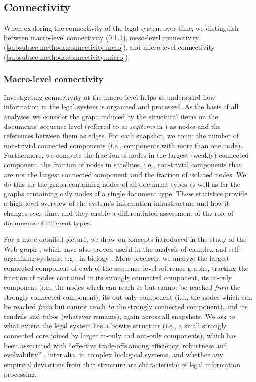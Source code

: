 \documentclass[utf8,sort&compress,table,hidelinks]{frontiersFPHY} %
\begin{document}
\vspace*{6pt}
\subsection{Connectivity}
\label{subsec:methods:connectivity}

When exploring the connectivity of the legal system over time, we distinguish between macro-level connectivity (\ref{subsubsec:methods:connectivity:macro}), meso-level connectivity (\ref{subsubsec:methods:connectivity:meso}), and micro-level connectivity (\ref{subsubsec:methods:connectivity:micro}). 

\vspace*{6pt}
\subsubsection{Macro-level connectivity}
\label{subsubsec:methods:connectivity:macro}

Investigating connectivity at the macro level helps us understand how information in the legal system is organized and processed. 
As the basis of all analyses, we consider the graph induced by the structural items on the documents' sequence level (referred to as \emph{seqitems} in \cite{katz2020}) as nodes and the references between them as edges. 
For each snapshot, we count the number of non-trivial connected components (i.e., components with more than one node). 
Furthermore, we compute the fraction of nodes in the largest (weakly) connected component, 
the fraction of nodes in satellites, i.e., non-trivial components that are not the largest connected component, 
and the fraction of isolated nodes. 
We do this for the graph containing nodes of all document types as well as for the graphs containing only nodes of a single document type. 
These statistics provide a high-level overview of the system's information infrastructure and how it changes over time, 
and they enable a differentiated assessment of the role of documents of different types. 

For a more detailed picture, we draw on concepts introduced in the study of the Web graph \cite{broder2000}, which have also proven useful in the analysis of complex and self-organizing systems, e.g., in biology \cite{friedlander2015,csete2004,ma2003}. 
More precisely, we analyze the largest connected component of each of the sequence-level reference graphs, 
tracking the fraction of nodes contained in its strongly connected component, its in-only component (i.e., the nodes which can reach \emph{to} but cannot be reached \emph{from} the strongly connected component), its out-only component (i.e., the nodes which can be reached \emph{from} but cannot reach \emph{to} the strongly connected component), and its tendrils and tubes (whatever remains), 
again across all snapshots.
We ask to what extent the legal system has a bowtie structure (i.e., a small strongly connected core joined by larger in-only and out-only components), which has been associated with ``effective trade-offs among efficiency, robustness and evolvability'' \cite{csete2004}, inter alia, in complex biological systems, and whether any empirical deviations from that structure are characteristic of legal information processing.
\end{document}
